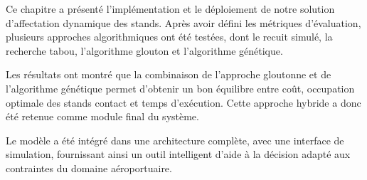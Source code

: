 Ce chapitre a présenté l’implémentation et le déploiement de notre solution d’affectation dynamique des stands. Après avoir défini les métriques d’évaluation, plusieurs approches algorithmiques ont été testées, dont le recuit simulé, la recherche tabou, l’algorithme glouton et l’algorithme génétique.

Les résultats ont montré que la combinaison de l’approche gloutonne et de l’algorithme génétique permet d’obtenir un bon équilibre entre coût, occupation optimale des stands contact et temps d’exécution. Cette approche hybride a donc été retenue comme module final du système.

Le modèle a été intégré dans une architecture complète, avec une interface de simulation, fournissant ainsi un outil intelligent d’aide à la décision adapté aux contraintes du domaine aéroportuaire.

